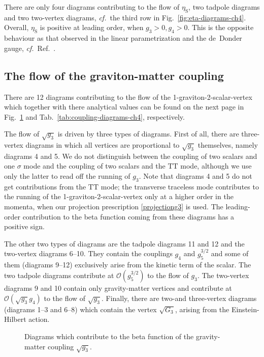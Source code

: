 \documentclass[11pt]{book} %
\newcommand\etaS{ \eta_{\scriptscriptstyle{\mathrm{S}}} }
\newcommand\cf{\textit{cf.}\ }
\numberwithin{equation}{chapter}
\begin{document}
There are only four diagrams contributing to the flow of $\etaS$, two tadpole diagrams and two two-vertex diagrams,
\cf the third row in Fig.~\ref{fig:eta-diagrams-ch4}.
Overall, $\etaS$ is positive at leading order, when $g_3>0, g_4>0$.
This is the opposite behaviour as that observed in the linear parametrization
and the de~Donder gauge, \cf Ref.~\cite{Dona:2013qba}.


\subsection{The flow of the graviton-matter coupling}

There are 12 diagrams contributing to the
flow of the 1-graviton-2-scalar-vertex
which together with there analytical values can be found on
the next page
in Fig.~\ref{fig:coupling-diagrams-ch4} and Tab.~\ref{tab:coupling-diagrams-ch4},
respectively.


The flow of $\sqrt{g_3}$ is driven by three types of diagrams.
First of all, there are three-vertex diagrams in which all
vertices are proportional to $\sqrt{g_3}$ themselves,
namely diagrams 4 and 5.
We do not distinguish between the coupling of two
scalars and one $\sigma$ mode and the coupling of two scalars and
the $\mathrm{TT}$ mode,
although we use only the latter to read off the running of $g_3$.
Note that diagrams 4 and 5 do not get contributions from the $\mathrm{TT}$ mode;
the transverse traceless mode contributes to the running of the
1-graviton-2-scalar-vertex only at a higher order in the momenta,
when our projection prescription \eqref{projectiong3} is used.
The leading-order contribution to the beta function coming from
these diagrams has a positive sign.

The other two types of diagrams are the tadpole diagrams 11 and 12
and the two-vertex diagrams 6--10.
They contain the couplings $g_4$ and $g_5^{3/2}$ and
some of them (diagrams 9--12) exclusively arise from the kinetic term of the scalar.
The two tadpole diagrams contribute at $\mathcal{O}(g_5^{3/2})$ to the flow of $g_3$.
The two-vertex diagrams 9 and 10 contain only gravity-matter vertices and contribute
at $\mathcal{O}(\sqrt{g_3} g_4)$ to the flow of $\sqrt{g_3}$.
Finally, there are two-and three-vertex diagrams (diagrams 1--3 and 6--8)
which contain the vertex $\sqrt{G_3}$, arising from the Einstein-Hilbert action.

\begin{figure}[p]
  \begin{center}
    
  \end{center}
  \caption{
    Diagrams which contribute to the beta function of the gravity-matter coupling
    $\sqrt{g_3}$.
  }
  \label{fig:coupling-diagrams-ch4}
\end{figure}
\end{document}
